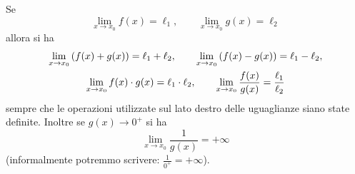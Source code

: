\begin{theorem}
  \label{th:operazioni_limiti}%
\mymark{***}%
Se
\[
  \lim_{x\to x_0}f(x) = \ell_1,\qquad
  \lim_{x\to x_0}g(x) = \ell_2
\]
allora si ha
\begin{gather*}
  \lim_{x\to x_0} {\left( f(x) + g(x) \right)} = \ell_1 + \ell_2, \qquad
  \lim_{x\to x_0} {\left( f(x) - g(x) \right)} = \ell_1 - \ell_2, \\
  \lim_{x\to x_0} f(x)\cdot g(x) = \ell_1 \cdot \ell_2, \qquad
  \lim_{x\to x_0} \frac{f(x)}{g(x)} = \frac{\ell_1}{\ell_2}
\end{gather*}
sempre che le operazioni utilizzate sul lato destro delle uguaglianze
siano state definite.
Inoltre se $g(x)\to 0^+$ 
si ha
\[
    \lim_{x\to x_0} \frac{1}{g(x)} = +\infty
\]
(informalmente potremmo scrivere: $\frac{1}{0^+} = +\infty$).
\end{theorem}
%
